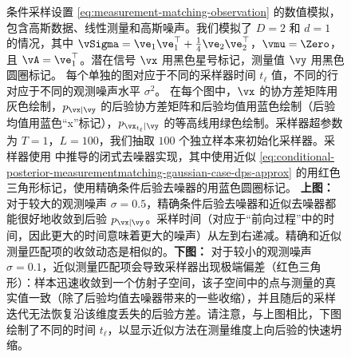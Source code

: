 \documentclass[../../book-main_zh.tex]{subfiles}
\begin{document}
\begin{figure}[tbp]
    \caption{条件采样设置
        \eqref{eq:measurement-matching-observation} 的数值模拟，包含高斯数据、线性测量和高斯噪声。我们模拟了 $D=2$ 和
        $d=1$ 的情况，其中 $\vSigma
        = \ve_1 \ve_1^\top + \tfrac{1}{4} \ve_2 \ve_2^\top$，$\vmu = \Zero$，且
        $\vA = \ve_1^\top$。潜在信号 $\vx$ 用黑色星号标记，测量值 $\vy$ 用黑色圆圈标记。
        每个单独的图对应于不同的采样器时间
        $t_{\ell}$ 值，不同的行对应于不同的观测噪声水平 $\sigma^2$。
        在每个图中，$\vx$ 的协方差矩阵用灰色绘制，$p_{\vx \mid \vy}$ 的后验协方差矩阵和后验均值用蓝色绘制（后验均值用蓝色“x”标记），$p_{\vx_{t_{\ell}} \mid \vy}$ 的等高线用绿色绘制。采样器超参数为 $T=1$，$L=100$，我们抽取 $100$ 个独立样本来初始化采样器。采样器使用
         中推导的闭式去噪器实现，其中使用近似
        \eqref{eq:conditional-posterior-measurementmatching-gaussian-case-dps-approx}
        的用红色三角形标记，使用精确条件后验去噪器的用蓝色圆圈标记。
        \textbf{上图：} 对于较大的观测噪声 $\sigma = 0.5$，精确条件后验去噪器和近似去噪器都能很好地收敛到后验 $p_{\vx \mid \vy}$。采样时间（对应于“前向过程”中的时间，因此更大的时间意味着更大的噪声）从左到右递减。精确和近似测量匹配项的收敛动态是相似的。\textbf{下图：} 对于较小的观测噪声 $\sigma = 0.1$，近似测量匹配项会导致采样器出现极端偏差（红色三角形）：样本迅速收敛到一个仿射子空间，该子空间中的点与测量的真实值一致（除了后验均值去噪器带来的一些收缩），并且随后的采样迭代无法恢复沿该维度丢失的后验方差。请注意，与上图相比，下图绘制了不同的时间 $t_{\ell}$，以显示近似方法在测量维度上向后验的快速坍缩。}
    \label{fig:conditional_sampling_computational_gaussian}
\end{figure}
\end{document}
